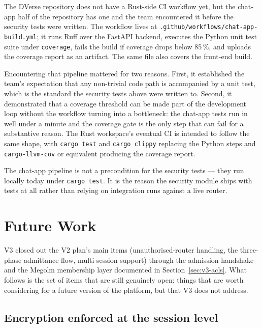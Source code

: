 \documentclass[11pt,a4paper]{article}
\begin{document}
The DVerse repository does not have a Rust-side CI workflow yet,
but the chat-app half of the repository has one and the team
encountered it before the security tests were written. The
workflow lives at
\texttt{.github/workflows/chat-app-build.yml}; it runs Ruff over
the FastAPI backend, executes the Python unit test suite under
\texttt{coverage}, fails the build if coverage drops below
85\,\%, and uploads the coverage report as an artifact. The same
file also covers the front-end build.

Encountering that pipeline mattered for two reasons. First, it
established the team's expectation that any non-trivial code
path is accompanied by a unit test, which is the standard the
security tests above were written to. Second, it demonstrated
that a coverage threshold can be made part of the development
loop without the workflow turning into a bottleneck: the
chat-app tests run in well under a minute and the coverage gate
is the only step that can fail for a substantive reason. The
Rust workspace's eventual CI is intended to follow the same
shape, with \texttt{cargo test} and \texttt{cargo clippy}
replacing the Python steps and \texttt{cargo-llvm-cov} or
equivalent producing the coverage report.

The chat-app pipeline is not a precondition for the security
tests — they run locally today under \texttt{cargo test}. It is
the reason the security module ships with tests at all rather
than relying on integration runs against a live router.

\section{Future Work}
\label{sec:future}

V3 closed out the V2 plan's main items (unauthorised-router
handling, the three-phase admittance flow, multi-session support)
through the admission handshake and the Megolm membership layer
documented in Section~\ref{sec:v3-acls}. What follows is the set of
items that are still genuinely open: things that are worth
considering for a future version of the platform, but that V3 does
not address.

\subsection{Encryption enforced at the session level}
\label{sec:enc-in-session}
\end{document}
